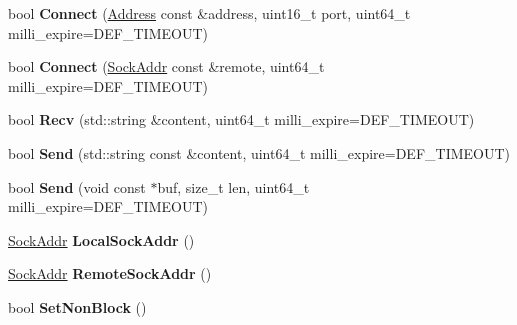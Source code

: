 \begin{DoxyCompactItemize}
\item 
\hypertarget{classlsf_1_1asio_1_1Socket_ad0582a7e280d915a428375b63c56a68d}{
bool {\bfseries Connect} (\hyperlink{classlsf_1_1asio_1_1Address}{Address} const \&address, uint16\_\-t port, uint64\_\-t milli\_\-expire=DEF\_\-TIMEOUT)}
\label{classlsf_1_1asio_1_1Socket_ad0582a7e280d915a428375b63c56a68d}

\item 
\hypertarget{classlsf_1_1asio_1_1Socket_a26cdb2b2f44a542ce41298f854084c63}{
bool {\bfseries Connect} (\hyperlink{classlsf_1_1asio_1_1SockAddr}{SockAddr} const \&remote, uint64\_\-t milli\_\-expire=DEF\_\-TIMEOUT)}
\label{classlsf_1_1asio_1_1Socket_a26cdb2b2f44a542ce41298f854084c63}

\item 
\hypertarget{classlsf_1_1asio_1_1Socket_a7a746f5a2929c56fbcfbbb21439a6642}{
bool {\bfseries Recv} (std::string \&content, uint64\_\-t milli\_\-expire=DEF\_\-TIMEOUT)}
\label{classlsf_1_1asio_1_1Socket_a7a746f5a2929c56fbcfbbb21439a6642}

\item 
\hypertarget{classlsf_1_1asio_1_1Socket_ad37798e9ab91781704f66eea7a4e7aea}{
bool {\bfseries Send} (std::string const \&content, uint64\_\-t milli\_\-expire=DEF\_\-TIMEOUT)}
\label{classlsf_1_1asio_1_1Socket_ad37798e9ab91781704f66eea7a4e7aea}

\item 
\hypertarget{classlsf_1_1asio_1_1Socket_a6f2342ebfcad55889435fb8cfff1500e}{
bool {\bfseries Send} (void const $\ast$buf, size\_\-t len, uint64\_\-t milli\_\-expire=DEF\_\-TIMEOUT)}
\label{classlsf_1_1asio_1_1Socket_a6f2342ebfcad55889435fb8cfff1500e}

\item 
\hypertarget{classlsf_1_1asio_1_1Socket_a55a943c161cd9f0c496bf65e01c64aa5}{
\hyperlink{classlsf_1_1asio_1_1SockAddr}{SockAddr} {\bfseries LocalSockAddr} ()}
\label{classlsf_1_1asio_1_1Socket_a55a943c161cd9f0c496bf65e01c64aa5}

\item 
\hypertarget{classlsf_1_1asio_1_1Socket_ac6c6d8910025e3e7cc956cdd268bcbb8}{
\hyperlink{classlsf_1_1asio_1_1SockAddr}{SockAddr} {\bfseries RemoteSockAddr} ()}
\label{classlsf_1_1asio_1_1Socket_ac6c6d8910025e3e7cc956cdd268bcbb8}

\item 
\hypertarget{classlsf_1_1asio_1_1Socket_a7933def8e97a6fc9f000306fa24d9587}{
bool {\bfseries SetNonBlock} ()}
\label{classlsf_1_1asio_1_1Socket_a7933def8e97a6fc9f000306fa24d9587}


\end{DoxyCompactItemize}
